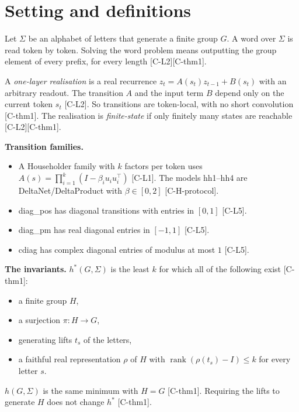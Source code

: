 \documentclass[10pt,twocolumn,a4paper]{article}
\providecommand{\tightlist}{\setlength{\itemsep}{0pt}\setlength{\parskip}{0pt}}
\begin{document}
\section{Setting and definitions}\label{setting-and-definitions}

Let \(\Sigma\) be an alphabet of letters that generate a finite group \(G\). A word over \(\Sigma\) is read token by token. Solving the word problem means outputting the group element of every prefix, for every length {[}C-L2{]}{[}C-thm1{]}.

A \emph{one-layer realisation} is a real recurrence \(z_t = A(s_t) z_{t-1} + B(s_t)\) with an arbitrary readout. The transition \(A\) and the input term \(B\) depend only on the current token \(s_t\) {[}C-L2{]}. So transitions are token-local, with no short convolution {[}C-thm1{]}. The realisation is \emph{finite-state} if only finitely many states are reachable {[}C-L2{]}{[}C-thm1{]}.

\textbf{Transition families.}

\begin{itemize}
\tightlist
\item
  A Householder family with \(k\) factors per token uses \(A(s) = \prod_{i=1}^k (I - \beta_i u_i u_i^\top)\) {[}C-L1{]}. The models hh1--hh4 are DeltaNet/DeltaProduct with \(\beta \in [0,2]\) {[}C-H-protocol{]}.
\item
  diag\_pos has diagonal transitions with entries in \([0,1]\) {[}C-L5{]}.
\item
  diag\_pm has real diagonal entries in \([-1,1]\) {[}C-L5{]}.
\item
  cdiag has complex diagonal entries of modulus at most \(1\) {[}C-L5{]}.
\end{itemize}

\textbf{The invariants.} \(h^*(G,\Sigma)\) is the least \(k\) for which all of the following exist {[}C-thm1{]}:

\begin{itemize}
\tightlist
\item
  a finite group \(H\),
\item
  a surjection \(\pi: H \to G\),
\item
  generating lifts \(t_s\) of the letters,
\item
  a faithful real representation \(\rho\) of \(H\) with \(\operatorname{rank}(\rho(t_s) - I) \le k\) for every letter \(s\).
\end{itemize}

\(h(G,\Sigma)\) is the same minimum with \(H = G\) {[}C-thm1{]}. Requiring the lifts to generate \(H\) does not change \(h^*\) {[}C-thm1{]}.
\end{document}

